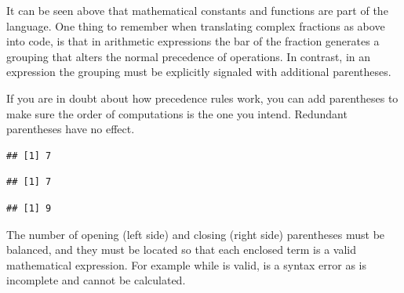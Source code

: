 \documentclass[krantz2]{krantz}\usepackage{knitr}%
\begin{document}
It can be seen above that mathematical constants and functions are part of the \Rlang language. One thing to remember when translating complex fractions as above into \Rlang code, is that in arithmetic expressions the bar of the fraction generates a grouping that alters the normal precedence of operations. In contrast, in an \Rlang expression the grouping must be explicitly signaled with additional parentheses.

If you are in doubt about how precedence rules work, you can add parentheses to make sure the order of computations is the one you intend. Redundant parentheses have no effect.

\begin{knitrout}\footnotesize
{}\color{fgcolor}\begin{kframe}
\begin{alltt}
 \hlopt{+}  \hlopt{*} 
\end{alltt}
\begin{verbatim}
## [1] 7
\end{verbatim}
\begin{alltt}
 \hlopt{+} \hlstd{(} \hlopt{*} \hlstd{)}
\end{alltt}
\begin{verbatim}
## [1] 7
\end{verbatim}
\begin{alltt}
\hlstd{(} \hlopt{+} \hlstd{)} \hlopt{*} 
\end{alltt}
\begin{verbatim}
## [1] 9
\end{verbatim}
\end{kframe}
\end{knitrout}

The number of opening (left side) and closing (right side) parentheses must be balanced, and they must be located so that each enclosed term is a valid mathematical expression. For example while  is valid,  is a syntax error as  is incomplete and cannot be calculated.
\end{document}
